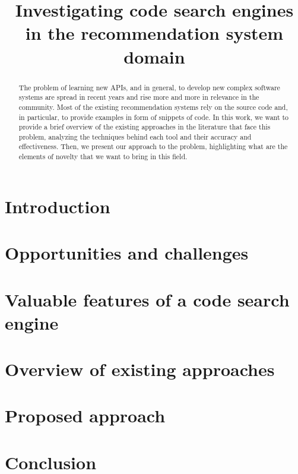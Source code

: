 \documentclass[10pt,conference]{IEEEtran}
\begin{document}
	
	\title{Investigating code search engines in the recommendation system domain  }%
	


	
	\maketitle
	
	\begin{abstract}	

The problem of learning new APIs, and in general, to develop new complex software systems are spread in recent years and rise more and more in relevance in the community. Most of the existing recommendation systems rely on the source code and, in particular, to provide examples in form of snippets of code. In this work, we want to provide a brief overview of the existing approaches in the literature that face this problem, analyzing the techniques behind each tool and their accuracy and effectiveness. Then, we present our approach to the problem, highlighting what are the elements of novelty that we want to bring in this field. 
 

	\end{abstract}

	
	\section{Introduction}
	\label{sec:Introduction}
	

	\section{Opportunities and challenges}
	\label{sec:Challenges}
	
	
	\section{Valuable features of a code search engine}
	\label{sec:Features}
		

	
	\section{Overview of existing approaches}
	\label{sec:RelatedWorks}
	
	
	\section{Proposed approach}
	\label{sec:ProposedApproach}
	
	
	
	\section{Conclusion}
	\label{sec:Conclusion}
	
	
	
	
	

	
	
	\balance
	
	
	
\end{document}

